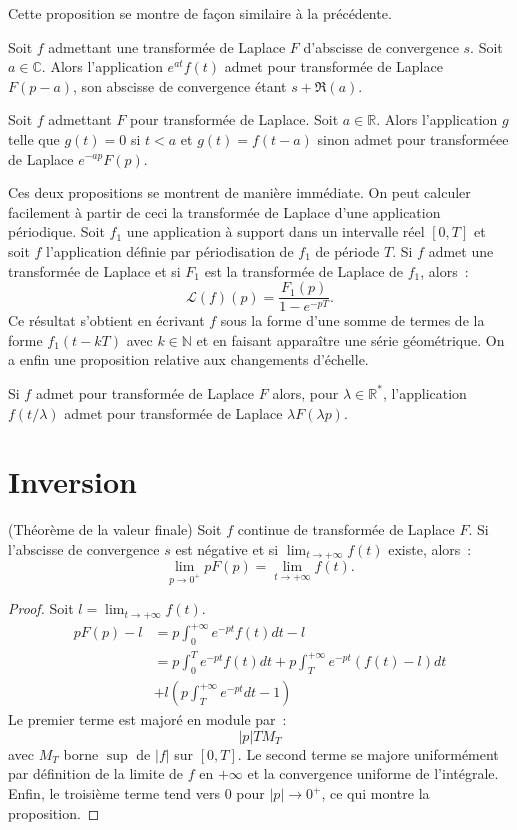 Cette proposition se montre de façon similaire à la précédente.
\begin{fprop}
Soit $f$ admettant une transformée de Laplace $F$ d'abscisse de
convergence $s$. Soit $a \in \mathbb{C}$. Alors l'application
$e^{at}f(t)$ admet pour transformée de Laplace $F(p-a)$, son abscisse
de convergence étant $s + \Re(a)$.
\end{fprop}
\begin{fprop}
Soit $f$ admettant $F$ pour transformée de Laplace. Soit $a \in
\mathbb{R}$. Alors
l'application $g$ telle que $g(t) = 0$ si $t < a$ et $g(t) = f(t-a)$
sinon admet pour transforméee de Laplace $e^{-ap}F(p)$.
\end{fprop}
Ces deux propositions se montrent de manière immédiate.
On peut calculer facilement à partir de ceci la transformée de Laplace
d'une application périodique. Soit $f_1$ une application à support
dans un intervalle réel $[0,T]$ et soit $f$ l'application définie par
périodisation de $f_1$ de période $T$. Si $f$ admet une transformée de
Laplace et si $F_1$ est la transformée de Laplace de $f_1$, alors~:
\[
\mathcal{L}(f)(p) = \frac{F_1(p)}{1-e^{-pT}}.
\]
Ce résultat s'obtient en écrivant $f$ sous la forme d'une somme de
termes de la forme $f_1(t-k T)$ avec $k \in \mathbb{N}$ et en faisant
apparaître une série géométrique.
On a enfin une proposition relative aux changements d'échelle.
\begin{fprop}
Si $f$ admet pour transformée de Laplace $F$ alors, pour $\lambda \in
\mathbb{R^*}$, l'application $f\left( t/\lambda \right)$ admet pour transformée de
Laplace $\lambda F(\lambda p).$
\end{fprop}
\section{Inversion}

\begin{fprop}(Théorème de la valeur finale)
Soit $f$ continue de transformée de Laplace $F$. Si l'abscisse de convergence
$s$ est négative et si $\lim_{t \to +\infty}f(t)$ existe, alors~:
\[
\lim_{p \to 0^+} p F(p) = \lim_{t \to +\infty} f(t).
\]
\end{fprop}

\begin{proof}
Soit $l = \lim_{t \to +\infty} f(t)$. 
\begin{align*}
pF(p) - l & = p \int_0^{+\infty} e^{-pt}f(t) dt - l \\
&= p \int_0^T  e^{-pt}f(t) dt + p  \int_T^{+\infty}e^{-pt}(f(t) -l) dt
\\ &+ l \left (
p \int_T^{+\infty} e^{-pt}dt -1
\right )
\end{align*}
Le premier terme est majoré en module par~:
\[
|p| T M_T
\]
avec $M_T$ borne $\sup$ de $|f|$ sur $[0,T]$.
Le second terme se majore uniformément par définition de la limite de
$f$ en $+\infty$ et la convergence uniforme de l'intégrale. Enfin, le
troisième terme tend vers 0 pour $|p|\to 0^+$, ce qui montre la proposition.
\end{proof}

